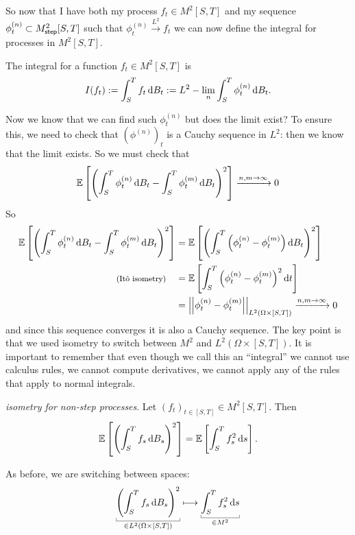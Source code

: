 \documentclass[12pt]{report}
\begin{document}
So now that I have both my process $f_{t}\in M^{2}[S,T]$ and my sequence $\phi_{t}^{(n)}\subset\mtus[S,T]$ such that $\phi_{t}^{(n)}\xrightarrow{L^{2}}f_{t}$ we can now define the \ito{} integral for processes in $M^{2}[S,T]$.
\begin{definition}
	The \ito{} integral for a function $f_{t}\in M^{2}[S,T]$ is
	\begin{equation*}
	I(f_{t}):=	\int_{S}^{T}f_{t}\dif B_{t}:=L^{2}-\lim_{n}\int_{S}^{T}\phi^{(n)}_{t}\dbt.
	\end{equation*}
\end{definition}
Now we know that we can find such $\phi^{(n)}_{t}$ but does the limit exist? To ensure this, we need to check that ${(\phi^{(n)})}_{t}$ is a Cauchy sequence in $L^{2}$: then we know that the limit exists. So we must check that
\begin{equation*}
	\ev{\left(\int_{S}^{T}\phi^{(n)}_{t}\dbt-\int_{S}^{T}\phi^{(m)}_{t}\dbt\right)^{2}}\xrightarrow{n,m\to\infty}0
\end{equation*}
So
\begin{align*}
	\ev{\left(\int_{S}^{T}\phi^{(n)}_{t}\dbt-\int_{S}^{T}\phi^{(m)}_{t}\dbt\right)^{2}}&=\ev{\left(\int_{S}^{T}\left(\phi^{(n)}_{t}-\phi^{(m)}_{t}\right)\dbt\right)^{2}}\\
	\text{\footnotesize (\ito{} isometry)}\quad&=\ev{\int_{S}^{T}\left(\phi^{(n)}_{t}-\phi^{(m)}_{t}\right)^{2}\dt}\\
	&=\norm{\phi^{(n)}_{t}-\phi^{(m)}_{t}}_{L^{2}(\Omega\times[S,T])}\xrightarrow{n,m\to\infty}0
\end{align*}
and since this sequence converges it is also a Cauchy sequence. The key point is that we used \ito{} isometry to switch between $M^{2}$ and $L^{2}(\Omega\times[S,T])$. It is important to remember that even though we call this an ``integral'' we cannot use calculus rules, we cannot compute derivatives, we cannot apply any of the rules that apply to normal integrals.
\begin{theorem}
	\emph{\ito{} isometry for non-step processes}. Let ${(f_{t})}_{t\in[S,T]}\in M^{2}[S,T]$. Then
	\begin{equation*}
		\ev{\left(\int_{S}^{T}f_{s}\dbs\right)^{2}}=\ev{\int_{S}^{T}f_{s}^{2}\ds}.
	\end{equation*}
\end{theorem}
As before, we are switching between spaces:
\begin{equation*}
	\ubracketthin{\left(\int_{S}^{T}f_{s}\dbs\right)^{2}}_{\in L^{2}(\Omega\times[S,T])}\longmapsto\ubracketthin{\int_{S}^{T}f_{s}^{2}\ds}_{\in M^{2}}
\end{equation*}
\end{document}
